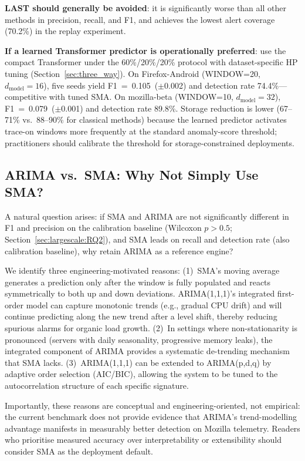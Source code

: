 \documentclass[a4paper,fleqn]{cas-sc}
\theoremstyle{plain}
\begin{document}
\textbf{LAST should generally be avoided}: it is significantly worse than
all other methods in precision, recall, and F1, and achieves the lowest
alert coverage (70.2\%) in the replay experiment.

\textbf{If a learned Transformer predictor is operationally preferred}:
use the compact Transformer under the 60\%/20\%/20\% protocol with
dataset-specific HP tuning (Section~\ref{sec:three_way}).
On Firefox-Android (WINDOW=20, $d_{\text{model}}=16$), five seeds yield
F1~=~0.105~($\pm$0.002) and detection rate 74.4\%---competitive with
tuned SMA.
On mozilla-beta (WINDOW=10, $d_{\text{model}}=32$), F1~=~0.079~($\pm$0.001)
and detection rate 89.8\%.
Storage reduction is lower (67--71\% vs.\ 88--90\% for classical methods)
because the learned predictor activates trace-on windows more frequently
at the standard anomaly-score threshold; practitioners should calibrate the
threshold for storage-constrained deployments.

\subsection{ARIMA vs.\ SMA: Why Not Simply Use SMA?}

A natural question arises: if SMA and ARIMA are not significantly different in
F1 and precision on the calibration baseline (Wilcoxon $p > 0.5$;
Section~\ref{sec:largescale:RQ2}), and SMA leads on recall and detection rate
(also calibration baseline), why retain ARIMA as a reference engine?

We identify three engineering-motivated reasons:
(1)~SMA's moving average generates a prediction only after the window is fully
populated and reacts symmetrically to both up and down deviations.
ARIMA(1,1,1)'s integrated first-order model can capture monotonic trends
(e.g., gradual CPU drift) and will continue predicting along the new trend
after a level shift, thereby reducing spurious alarms for organic load growth.
(2)~In settings where non-stationarity is pronounced (servers with daily
seasonality, progressive memory leaks), the integrated component of ARIMA
provides a systematic de-trending mechanism that SMA lacks.
(3)~ARIMA(1,1,1) can be extended to ARIMA(p,d,q) by adaptive order
selection (AIC/BIC), allowing the system to be tuned to the
autocorrelation structure of each specific signature.

Importantly, these reasons are conceptual and engineering-oriented, not
empirical: the current benchmark does not provide evidence that ARIMA's
trend-modelling advantage manifests in measurably better detection on
Mozilla telemetry.
Readers who prioritise measured accuracy over interpretability or
extensibility should consider SMA as the deployment default.
\end{document}
